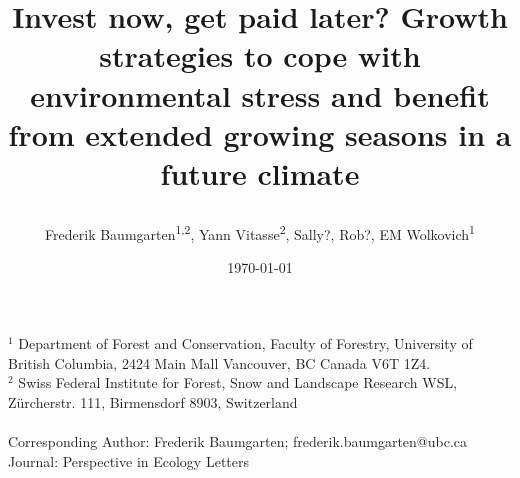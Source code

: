 \documentclass{article}
\begin{document}
	
	
	\title{Invest now, get paid later? Growth strategies to cope with environmental stress and benefit from extended growing seasons in a future climate %
		
		
	} 
	
	\date{\today}
	\author{Frederik Baumgarten\textsuperscript{1,2}, Yann Vitasse\textsuperscript{2}, Sally?, Rob?, EM Wolkovich\textsuperscript{1}}
	\maketitle
	
	$^1$ Department of Forest and Conservation, Faculty of Forestry, University of British Columbia, 2424 Main Mall
	Vancouver, BC Canada V6T 1Z4. \\
	
	
	
	$^2$  Swiss Federal Institute for Forest, Snow and Landscape Research WSL, Zürcherstr. 111, Birmensdorf 8903, Switzerland\\ \\
	
	Corresponding Author: Frederik Baumgarten; frederik.baumgarten@ubc.ca \\
	Journal: Perspective in Ecology Letters
	
	
	
\end{document}
